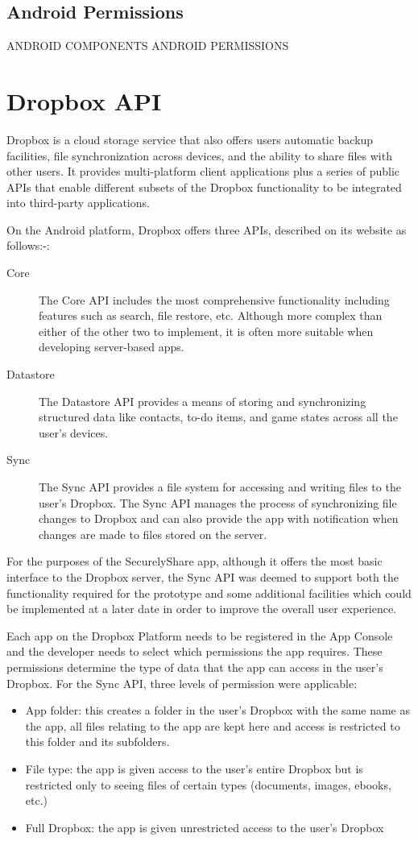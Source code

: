 \subsection{Android Permissions}

ANDROID COMPONENTS
ANDROID PERMISSIONS
\section{Dropbox API}
\label{sec:dropbox}
Dropbox is a cloud storage service that also offers users  automatic backup facilities, file synchronization across devices, and the ability to share files with other users.  It provides multi-platform client applications plus a series of public APIs that enable different subsets of the Dropbox functionality to be integrated into third-party applications.  

On the Android platform, Dropbox offers three APIs, described on its website as follows:-:
\begin{description}
	\item[Core]The Core API includes the most comprehensive functionality including features such as search, file restore, etc. Although more complex than either of the other two to implement, it is often more suitable when developing server-based apps.
	\item[Datastore]The Datastore API provides a means of storing and synchronizing structured data like contacts, to-do items, and game states across  all the user's devices.
	\item[Sync]The Sync API provides a file system for accessing and writing files to the user's Dropbox.  The Sync API manages the process of synchronizing file changes to Dropbox and can also provide the app with notification when changes are made to files stored on the server.
\end{description}

For the purposes of the SecurelyShare app, although it offers the most basic interface to the Dropbox server, the Sync API was deemed to support both the functionality required for the prototype and some additional facilities which could be implemented at a later date in order to improve the overall user experience.

Each app on the Dropbox Platform needs to be registered in the App Console and the developer needs to select which permissions the app requires. These permissions determine the type of data that the app can access in the user's Dropbox.  For the Sync API, three levels of permission were applicable:
\begin{itemize}
\item App folder:  this creates a folder in the user's Dropbox with the same name as the app, all files relating to the app are kept here and access is restricted to this folder and its subfolders.
\item File type: the app is given access to the user's entire Dropbox but is restricted only to seeing files of certain types (documents, images, ebooks, etc.)  
\item Full Dropbox:  the app is given unrestricted access to the user's Dropbox

\end{itemize}


